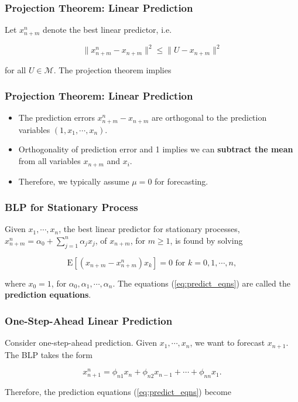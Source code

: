 \documentclass[%
xcolor=pdftex]{beamer}
\begin{document}
\begin{frame}
\frametitle{Projection Theorem: Linear Prediction}

Let $x_{n+m}^n$ denote the best linear predictor, i.e.

$$
\lVert x_{n+m}^n - x_{n+m} \rVert^2 \leq \lVert U - x_{n+m} \rVert^2
$$

for all $U \in \mathcal{M}$. The projection theorem implies\\

\vspace{40mm}

\end{frame}

\begin{frame}
\frametitle{Projection Theorem: Linear Prediction}

\begin{itemize}
\item The prediction errors $x_{n+m}^n - x_{n+m}$ are orthogonal to the prediction variables $(1,x_1, \cdots, x_n)$.
\item Orthogonality of prediction error and 1 implies we can \textbf{subtract the mean} from all variables $x_{n+m}$ and $x_i$.
\item Therefore, we typically assume $\mu=0$ for forecasting.
\end{itemize}


\end{frame}

\begin{frame}
\frametitle{BLP for Stationary Process}

Given $x_1, \cdots, x_n$, the best linear predictor for stationary processes, $x_{n+m}^n = \alpha_0 + \sum_{j=1}^n \alpha_j x_j$, of $x_{n+m}$, for $m \geq 1$, is found by solving

\begin{equation} \label{eq:predict_eqns}
\mbox{E}\left[ (x_{n+m} - x_{n+m}^n)x_k \right] = 0 \text{ for } k=0, 1,\cdots,n,
\end{equation}

where $x_0 =1$, for $\alpha_0,\alpha_1,\cdots,\alpha_n$. The equations (\ref{eq:predict_eqns}) are called the \textbf{prediction equations}.

\end{frame}

\begin{frame}
\frametitle{One-Step-Ahead Linear Prediction}

Consider one-step-ahead prediction. Given $x_1, \cdots, x_n$, we want to forecast $x_{n+1}$. The BLP takes the form

\begin{equation}
x_{n+1}^n = \phi_{n1}x_n + \phi_{n2} x_{n-1} + \cdots + \phi_{nn}x_1.
\end{equation}

Therefore, the prediction equations (\ref{eq:predict_eqns}) become\\

\vspace{50mm}

\end{frame}
\end{document}
